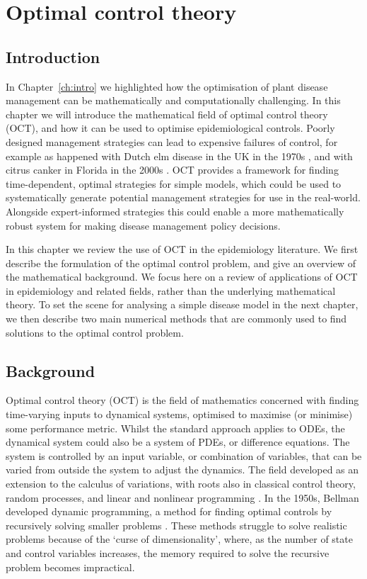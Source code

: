 %
\chapter{Optimal control theory}\label{ch:oct}

\section{Introduction}\label{sec:ch2:intro}

In Chapter~\ref{ch:intro} we highlighted how the optimisation of plant disease management can be mathematically and computationally challenging. In this chapter we will introduce the mathematical field of optimal control theory (OCT), and how it can be used to optimise epidemiological controls. Poorly designed management strategies can lead to expensive failures of control, for example as happened with Dutch elm disease in the UK in the 1970s \citep{tomlinson_too_2010}, and with citrus canker in Florida in the 2000s \citep{gottwald_citrus_2007}. OCT provides a framework for finding time-dependent, optimal strategies for simple models, which could be used to systematically generate potential management strategies for use in the real-world. Alongside expert-informed strategies this could enable a more mathematically robust system for making disease management policy decisions.

In this chapter we review the use of OCT in the epidemiology literature. We first describe the formulation of the optimal control problem, and give an overview of the mathematical background. We focus here on a review of applications of OCT in epidemiology and related fields, rather than the underlying mathematical theory. To set the scene for analysing a simple disease model in the next chapter, we then describe two main numerical methods that are commonly used to find solutions to the optimal control problem.

\section{Background}\label{sec:ch2:background}

Optimal control theory (OCT) is the field of mathematics concerned with finding time-varying inputs to dynamical systems, optimised to maximise (or minimise) some performance metric. Whilst the standard approach applies to ODEs,  the dynamical system could also be a system of PDEs, or difference equations. The system is controlled by an input variable, or combination of variables, that can be varied from outside the system to adjust the dynamics. The field developed as an extension to the calculus of variations, with roots also in classical control theory, random processes, and linear and nonlinear programming \citep{bryson_optimal_1996}. In the 1950s, Bellman developed dynamic programming, a method for finding optimal controls by recursively solving smaller problems \citep{bellman_dynamic_1957}. These methods struggle to solve realistic problems because of the `curse of dimensionality', where, as the number of state and control variables increases, the memory required to solve the recursive problem becomes impractical.

